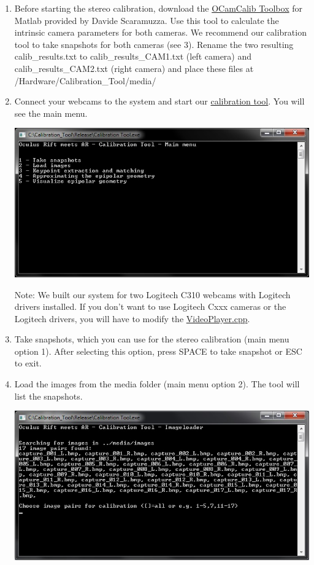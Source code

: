 \begin{enumerate}
\item 
Before starting the stereo calibration, download the \href{https://sites.google.com/site/scarabotix/ocamcalib-toolbox}{OCamCalib Toolbox} for Matlab provided by Davide Scaramuzza\cite{ocamcalib}. Use this tool to calculate the intrinsic camera parameters for both cameras. We recommend our calibration tool to take snapshots for both cameras (see 3). Rename the two resulting calib\_results.txt to calib\_results\_CAM1.txt (left camera) and calib\_results\_CAM2.txt (right camera) and place these files at /Hardware/Calibration\_Tool/media/
\item
  Connect your webcams to the system and start our
  \href{https://github.com/ands/OculusMeetsAR/tree/master/Hardware/Calibration_Tool}{calibration
  tool}. You will see the main menu.
	
  \includegraphics*[width=.92\textwidth]{0.jpg}
	
  Note: We built our system for two Logitech C310 webcams with Logitech
  drivers installed. If you don't want to use Logitech Cxxx cameras or
  the Logitech drivers, you will have to modify the
  \href{https://github.com/ands/OculusMeetsAR/tree/master/ARLib/src/Video}{VideoPlayer.cpp}.
\item
  Take snapshots, which you can use for the stereo calibration (main
  menu option 1). After selecting this option, press SPACE to take
  snapshot or ESC to exit.
\item
  Load the images from the media folder (main menu option 2). The tool
  will list the snapshots.
	
  \includegraphics*[width=.92\textwidth]{2.jpg}
	

\end{enumerate}
